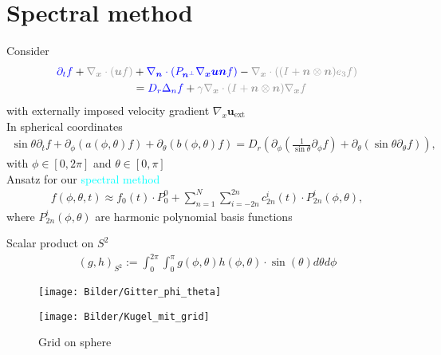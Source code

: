 \section{Spectral method}
\begin{frame}
	\scriptsize
	Consider 
	\begin{align}
		\textcolor{blue}{\partial_t f}+ \textcolor{gray!80}{\nabla_{\boldsymbol{x}} \cdot(\boldsymbol{u} f)} & +\textcolor{blue}{\nabla_{\boldsymbol{n}} \cdot\left(P_{\boldsymbol{n}^{\perp}} \nabla_{\boldsymbol{x}} \boldsymbol{u} \boldsymbol{n} f\right)}-\textcolor{gray!80}{\nabla_{\boldsymbol{x}} \cdot\left((I+\boldsymbol{n} \otimes \boldsymbol{n}) e_3 f\right)} \notag \\
		& = \textcolor{blue}{D_r \Delta_n f}+\textcolor{gray!80}{\gamma \nabla_{\boldsymbol{x}} \cdot(I+\boldsymbol{n} \otimes \boldsymbol{n}) \nabla_{\boldsymbol{x}} f} \label{SmochEq_kurz}
	\end{align}
    with externally imposed velocity gradient $\nabla_x \boldsymbol{u}_{\mathrm{ext}}$\\
	\vspace{12pt}
	\pause
	In spherical coordinates
	\begin{align}
		\sin \theta \partial_t f + \partial_\phi\left(a(\phi, \theta) f\right)+\partial_\theta\left(b(\phi, \theta) f\right) = D_r \left(\partial_\phi\left(\frac{1}{\sin \theta} \partial_\phi f\right)+\partial_\theta\left(\sin \theta \partial_\theta f\right)\right), \label{Smochluch_S2}
	\end{align}
	with $\phi \in [0, 2 \pi]$ and $\theta \in [0, \pi]$\\
	\vspace{12pt}
	\pause
   	Ansatz for our \textcolor{cyan}{spectral method}
	\begin{align}
		f(\phi, \theta, t) \approx f_0(t) \cdot P_0^0 + \sum_{n=1}^{N} \sum_{i=-2n}^{2n} c^i_{2n}(t) \cdot P^i_{2n}(\phi, \theta), \label{ansatz}
	\end{align}
	where $P^i_{2n}(\phi, \theta)$ are harmonic polynomial basis functions %
\end{frame}


\begin{frame}
	Scalar product on $S^2$
	\begin{align*}
		(g,h)_{S^2} := \int_{0}^{2\pi} \int_{0}^{\pi} g(\phi, \theta) h(\phi, \theta) \cdot \sin(\theta) d\theta d\phi
	\end{align*}

	\begin{figure}
		\small
		\begin{minipage}{0.46\textwidth}
			\texttt{[image: Bilder/Gitter\_phi\_theta]}
		\end{minipage}
		\hfill 
		\begin{minipage}{0.5\textwidth}
			\texttt{[image: Bilder/Kugel\_mit\_grid]}
		\end{minipage}
	\caption{Grid on sphere}
	\end{figure}
\end{frame}



